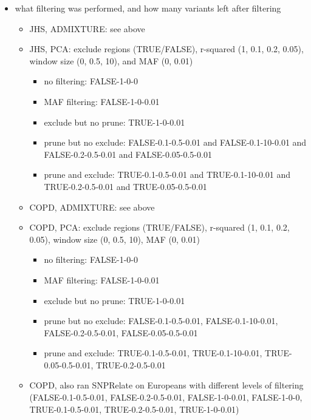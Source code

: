 \documentclass[12pt]{article}
\begin{document}

\begin{itemize}
\item what filtering was performed, and how many variants left after filtering
	\begin{itemize}
	\item JHS, ADMIXTURE: see above
	\item JHS, PCA: exclude regions (TRUE/FALSE), r-squared (1, 0.1, 0.2, 0.05), window size (0, 0.5, 10), and MAF (0, 0.01) 
		\begin{itemize}
		\item no filtering: FALSE-1-0-0
		\item MAF filtering: FALSE-1-0-0.01
		\item exclude but no prune: TRUE-1-0-0.01
		\item prune but no exclude: FALSE-0.1-0.5-0.01 and FALSE-0.1-10-0.01 and FALSE-0.2-0.5-0.01 and FALSE-0.05-0.5-0.01
		\item prune and exclude: TRUE-0.1-0.5-0.01 and TRUE-0.1-10-0.01 and TRUE-0.2-0.5-0.01 and TRUE-0.05-0.5-0.01
		\end{itemize}
	\item COPD, ADMIXTURE: see above
	\item COPD, PCA: exclude regions (TRUE/FALSE), r-squared (1, 0.1, 0.2, 0.05), window size (0, 0.5, 10), MAF (0, 0.01)
		\begin{itemize}
		\item no filtering: FALSE-1-0-0
		\item MAF filtering: FALSE-1-0-0.01
		\item exclude but no prune: TRUE-1-0-0.01
		\item prune but no exclude: FALSE-0.1-0.5-0.01, FALSE-0.1-10-0.01, FALSE-0.2-0.5-0.01, FALSE-0.05-0.5-0.01
		\item prune and exclude: TRUE-0.1-0.5-0.01, TRUE-0.1-10-0.01, TRUE-0.05-0.5-0.01, TRUE-0.2-0.5-0.01
		\end{itemize}	
	\item COPD, also ran SNPRelate on Europeans with different levels of filtering (FALSE-0.1-0.5-0.01, FALSE-0.2-0.5-0.01, FALSE-1-0-0.01, FALSE-1-0-0, TRUE-0.1-0.5-0.01, TRUE-0.2-0.5-0.01, TRUE-1-0-0.01)
	\end{itemize}
\end{itemize}
\end{document}
